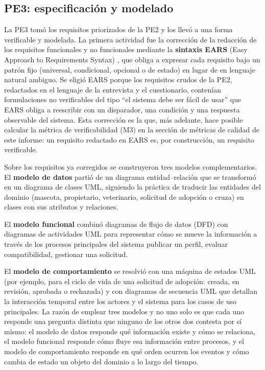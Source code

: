 \documentclass[journal,onecolumn]{IEEEtran}
\begin{document}
\subsection{PE3: especificación y modelado}

La PE3 tomó los requisitos priorizados de la PE2 y los llevó a una forma verificable y
modelada. La primera actividad fue la corrección de la redacción de los requisitos
funcionales y no funcionales mediante la \textbf{sintaxis EARS} (Easy Approach to
Requirements Syntax) \cite{mavin2009}, que obliga a expresar cada requisito bajo un patrón
fijo (universal, condicional, opcional o de estado) en lugar de en lenguaje natural
ambiguo. Se eligió EARS porque los requisitos crudos de la PE2, redactados en el lenguaje
de la entrevista y el cuestionario, contenían formulaciones no verificables del tipo
``el sistema debe ser fácil de usar'' que EARS obliga a reescribir con un disparador, una
condición y una respuesta observable del sistema. Esta corrección es la que, más adelante,
hace posible calcular la métrica de verificabilidad (M3) en la sección de métricas de
calidad de este informe: un requisito redactado en EARS es, por construcción, un requisito
verificable.

Sobre los requisitos ya corregidos se construyeron tres modelos complementarios. El
\textbf{modelo de datos} partió de un diagrama entidad--relación que se transformó en un
diagrama de clases UML, siguiendo la práctica de traducir las entidades del dominio
(mascota, propietario, veterinario, solicitud de adopción o cruza) en clases con sus
atributos y relaciones. 

El \textbf{modelo funcional} combinó diagramas de flujo de datos
(DFD) con diagramas de actividades UML para representar cómo se mueve la información a
través de los procesos principales del sistema publicar un perfil, evaluar
compatibilidad, gestionar una solicitud. 

El \textbf{modelo de comportamiento} se resolvió
con una máquina de estados UML (por ejemplo, para el ciclo de vida de una solicitud de
adopción: creada, en revisión, aprobada o rechazada) y con diagramas de secuencia UML que
detallan la interacción temporal entre los actores y el sistema para los casos de uso
principales. La razón de emplear tres modelos y no uno solo es que cada uno responde una
pregunta distinta que ninguno de los otros dos contesta por sí mismo: el modelo de datos
responde qué información existe y cómo se relaciona, el modelo funcional responde cómo
fluye esa información entre procesos, y el modelo de comportamiento responde en qué orden
ocurren los eventos y cómo cambia de estado un objeto del dominio a lo largo del tiempo.
\end{document}
